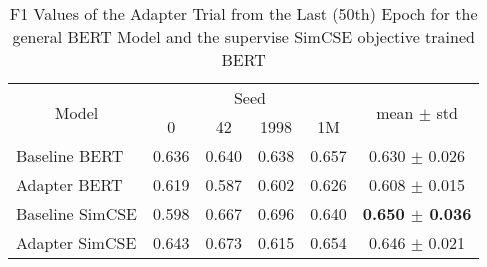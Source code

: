 \begin{table}[!t]
    \centering
    \caption{F1 Values of the Adapter Trial from the Last (50th) Epoch for the general BERT Model and
             the supervise SimCSE objective trained BERT}
    \label{tab:my-adapt}
    \begin{tabular}{|l||cccc|c|}
    \hline
    \multicolumn{1}{|c||}{\multirow{2}{*}{Model}} & \multicolumn{4}{c|}{Seed}                                                                    & \multirow{2}{*}{mean $\pm$ std} \\ \cline{2-5}
    \multicolumn{1}{|c||}{}                       & \multicolumn{1}{c|}{0}     & \multicolumn{1}{c|}{42}    & \multicolumn{1}{c|}{1998}  & 1M    &                                 \\ \hline\hline
    Baseline BERT                                 & \multicolumn{1}{c|}{0.636} & \multicolumn{1}{c|}{0.640} & \multicolumn{1}{c|}{0.638} & 0.657 & 0.630 $\pm$ 0.026               \\ \hline
    Adapter BERT                                  & \multicolumn{1}{c|}{0.619} & \multicolumn{1}{c|}{0.587} & \multicolumn{1}{c|}{0.602} & 0.626 & 0.608 $\pm$ 0.015               \\ \hline
    Baseline SimCSE                               & \multicolumn{1}{c|}{0.598} & \multicolumn{1}{c|}{0.667} & \multicolumn{1}{c|}{0.696} & 0.640 & \textbf{0.650 $\pm$ 0.036}               \\ \hline
    Adapter SimCSE                                & \multicolumn{1}{c|}{0.643} & \multicolumn{1}{c|}{0.673} & \multicolumn{1}{c|}{0.615} & 0.654 & 0.646 $\pm$ 0.021      \\ \hline
    \end{tabular}
\end{table}

